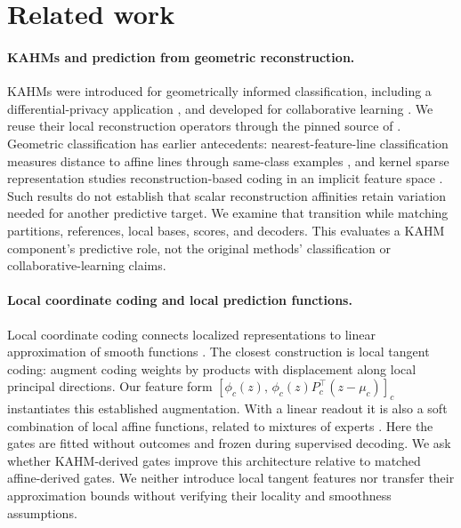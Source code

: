 \section{Related work}
\label{sec:related}

\paragraph{KAHMs and prediction from geometric reconstruction.}
KAHMs were introduced for geometrically informed classification, including
a differential-privacy application \citep{Kumar2024KAHM}, and developed for
collaborative learning \citep{Kumar2025Collaborative}. We reuse their local
reconstruction operators through the pinned source of
\citet{Kumar2026Software}. Geometric classification has earlier antecedents:
nearest-feature-line classification measures distance to affine lines through
same-class examples \citep{Li1999FeatureLine}, and kernel sparse
representation studies reconstruction-based coding in an implicit feature
space \citep{Gao2010KernelSparse}. Such results do not establish that scalar
reconstruction affinities retain variation needed for another predictive
target. We examine that transition while matching partitions, references,
local bases, scores, and decoders. This evaluates a KAHM component's
predictive role, not the original methods' classification or
collaborative-learning claims.

\paragraph{Local coordinate coding and local prediction functions.}
Local coordinate coding connects localized representations to linear
approximation of smooth functions \citep{Yu2009LCC}. The closest construction
is local tangent coding: \citet{Yu2010LTC} augment coding weights by products
with displacement along local principal directions. Our feature form
$[\phi_c(z),\,\phi_c(z)P_c^\top(z-\mu_c)]_c$ instantiates this established
augmentation. With a linear readout it is also a soft combination of local
affine functions, related to mixtures of experts \citep{Jacobs1991Experts}.
Here the gates are fitted without outcomes and frozen during supervised
decoding. We ask whether KAHM-derived gates improve this architecture relative
to matched affine-derived gates. We neither introduce local tangent features
nor transfer their approximation bounds without verifying their locality
and smoothness assumptions.


